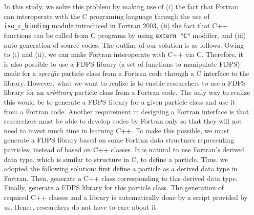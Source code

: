 \documentclass[proof,useamsfonts]{pasj01}
\begin{document}
In this study, we solve this problem by making use of (i) the fact that Fortran can interoperate with the C programing language through the use of  \texttt{iso\_c\_binding} module introduced in Fortran 2003, (ii) the fact that C++ functions can be called from C programs by using \texttt{extern "C"} modifier, and (iii) auto generation of source codes. The outline of our solution is as follows. Owing to (i) and (ii), we can make Fortran interoperate with C++ via C. Therefore, it is also possible to use a FDPS library (a set of functions to manipulate FDPS) made for a \textit{specific} particle class from a Fortran code through a C interface to the library. However, what we want to realize is to enable researchers to use a FDPS library for an \textit{arbitrary} particle class from a Fortran code. The only way to realize this would be to generate a FDPS library for a given particle class and use it from a Fortran code. Another requirement in designing a Fortran interface is that researchers must be able to develop codes by Fortran only so that they will not need to invest much time in learning C++. To make this possible, we must generate a FDPS library based on some Fortran data structures representing particles, instead of based on C++ classes. It is natural to use Fortran's derived data type, which is similar to structure in C, to define a particle. Thus, we adopted the following solution: first define a particle as a derived data type in Fortran. Then, generate a C++ class corresponding to this derived data type. Finally, generate a FDPS library for this particle class. The generation of required C++ classes and a library is automatically done by a script provided by us. Hence, researchers do not have to care about it.
\end{document}
